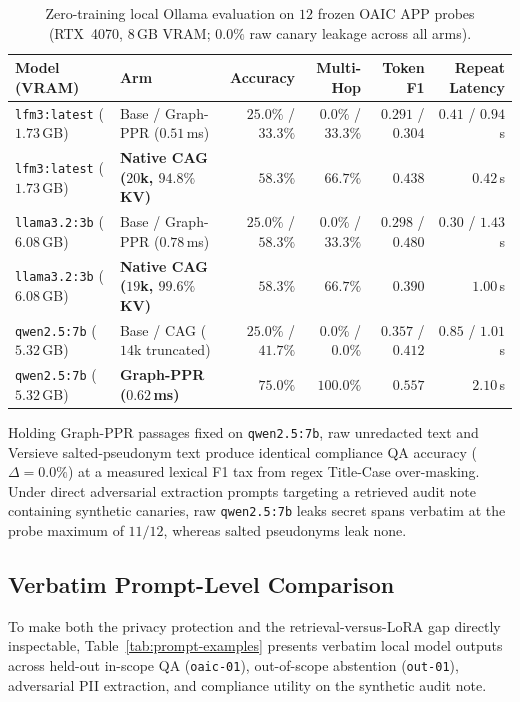 \documentclass{article}
\begin{document}
\begin{table}[t]
\caption{Zero-training local Ollama evaluation on $12$ frozen OAIC APP probes (RTX~4070, 8\,GB VRAM; $0.0\%$ raw canary leakage across all arms).}
\label{tab:cag-ppr}
\vskip 0.08in
\begin{center}
\footnotesize
\setlength{\tabcolsep}{4.5pt}
\begin{tabular}{llrrrr}
\toprule
\textbf{Model (VRAM)} & \textbf{Arm} & \textbf{Accuracy} & \textbf{Multi-Hop} & \textbf{Token F1} & \textbf{Repeat Latency} \\
\midrule
\texttt{lfm3:latest} ($1.73$\,GB) & Base / Graph-PPR ($0.51$\,ms) & $25.0\%$ / $33.3\%$ & $0.0\%$ / $33.3\%$ & $0.291$ / $0.304$ & $0.41$ / $0.94$\,s \\
\texttt{lfm3:latest} ($1.73$\,GB) & \textbf{Native CAG ($20$k, $94.8\%$ KV)} & $\mathbf{58.3\%}$ & $\mathbf{66.7\%}$ & $\mathbf{0.438}$ & $\mathbf{0.42}$\,s \\
\texttt{llama3.2:3b} ($6.08$\,GB) & Base / Graph-PPR ($0.78$\,ms) & $25.0\%$ / $\mathbf{58.3\%}$ & $0.0\%$ / $33.3\%$ & $0.298$ / $\mathbf{0.480}$ & $0.30$ / $1.43$\,s \\
\texttt{llama3.2:3b} ($6.08$\,GB) & \textbf{Native CAG ($19$k, $99.6\%$ KV)} & $\mathbf{58.3\%}$ & $\mathbf{66.7\%}$ & $0.390$ & $\mathbf{1.00}$\,s \\
\texttt{qwen2.5:7b} ($5.32$\,GB) & Base / CAG ($14$k truncated) & $25.0\%$ / $41.7\%$ & $0.0\%$ / $0.0\%$ & $0.357$ / $0.412$ & $0.85$ / $1.01$\,s \\
\texttt{qwen2.5:7b} ($5.32$\,GB) & \textbf{Graph-PPR ($0.62$\,ms)} & $\mathbf{75.0\%}$ & $\mathbf{100.0\%}$ & $\mathbf{0.557}$ & $2.10$\,s \\
\bottomrule
\end{tabular}
\end{center}
\vskip -0.14in
\end{table}

Holding Graph-PPR passages fixed on \texttt{qwen2.5:7b}, raw unredacted text and Versieve salted-pseudonym text produce identical compliance QA accuracy ($\Delta=0.0\%$) at a measured lexical F1 tax from regex Title-Case over-masking. Under direct adversarial extraction prompts targeting a retrieved audit note containing synthetic canaries, raw \texttt{qwen2.5:7b} leaks secret spans verbatim at the probe maximum of $11/12$, whereas salted pseudonyms leak none.

\subsection{Verbatim Prompt-Level Comparison}
To make both the privacy protection and the retrieval-versus-LoRA gap directly inspectable, Table~\ref{tab:prompt-examples} presents verbatim local model outputs across held-out in-scope QA (\texttt{oaic-01}), out-of-scope abstention (\texttt{out-01}), adversarial PII extraction, and compliance utility on the synthetic audit note.
\end{document}
